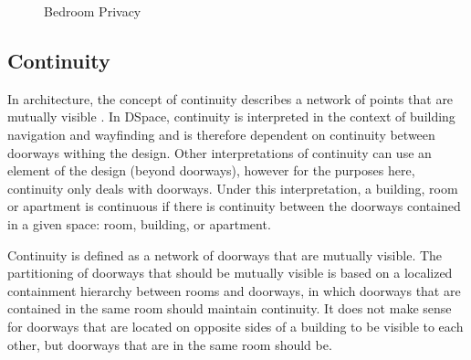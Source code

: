 \documentclass[12pt]{ucthesis}
\begin{document}
\begin{figure}[H]
 \centering
  \hspace{5mm}
 \caption{Bedroom Privacy}
\label{room-privacy}
\end{figure}

\subsection{Continuity}
In architecture, the concept of continuity describes a network of points that are mutually visible \cite{Key}. In DSpace, continuity is interpreted in the context of building navigation and wayfinding and is therefore dependent on continuity between doorways withing the design. Other interpretations of continuity can use an element of the design (beyond doorways), however for the purposes here, continuity only deals with doorways. Under this interpretation, a building, room or apartment is continuous if there is continuity between the doorways contained in a given space: room, building, or apartment. 

Continuity is defined as a network of doorways that are mutually visible. The partitioning of doorways that should be mutually visible is based on a localized containment hierarchy between rooms and doorways, in which doorways that are contained in the same room should maintain continuity. It does not make sense for doorways that are located on opposite sides of a building to be visible to each other, but doorways that are in the same room should be. 
\end{document}
